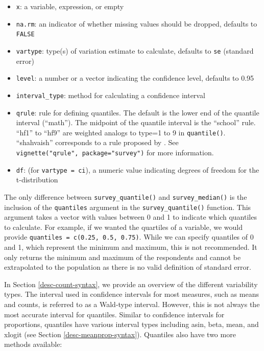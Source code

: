 \documentclass[
]{krantz}
\providecommand{\tightlist}{%
  \setlength{\itemsep}{0pt}\setlength{\parskip}{0pt}}
\begin{document}
\begin{itemize}
\tightlist
\item
  \texttt{x}: a variable, expression, or empty
\item
  \texttt{na.rm}: an indicator of whether missing values should be dropped, defaults to \texttt{FALSE}
\item
  \texttt{vartype}: type(s) of variation estimate to calculate, defaults to \texttt{se} (standard error)
\item
  \texttt{level}: a number or a vector indicating the confidence level, defaults to 0.95
\item
  \texttt{interval\_type}: method for calculating a confidence interval
\item
  \texttt{qrule}: rule for defining quantiles. The default is the lower end of the quantile interval (``math''). The midpoint of the quantile interval is the ``school'' rule. ``hf1'' to ``hf9'' are weighted analogs to type=1 to 9 in \texttt{quantile()}. ``shahvaish'' corresponds to a rule proposed by \citet{shahvaish}. See \texttt{vignette("qrule",\ package="survey")} for more information.
\item
  \texttt{df}: (for \texttt{vartype\ =\ \textquotesingle{}ci\textquotesingle{}}), a numeric value indicating degrees of freedom for the t-distribution
\end{itemize}

The only difference between \texttt{survey\_quantile()} and \texttt{survey\_median()} is the inclusion of the \texttt{quantiles} argument in the \texttt{survey\_quantile()} function. This argument takes a vector with values between 0 and 1 to indicate which quantiles to calculate. For example, if we wanted the quartiles of a variable, we would provide \texttt{quantiles\ =\ c(0.25,\ 0.5,\ 0.75)}. While we can specify quantiles of 0 and 1, which represent the minimum and maximum, this is not recommended. It only returns the minimum and maximum of the respondents and cannot be extrapolated to the population as there is no valid definition of standard error.

In Section \ref{desc-count-syntax}, we provide an overview of the different variability types. The interval used in confidence intervals for most measures, such as means and counts, is referred to as a Wald-type interval. However, this is not always the most accurate interval for quantiles. Similar to confidence intervals for proportions, quantiles have various interval types including asin, beta, mean, and xlogit (see Section \ref{desc-meanprop-syntax}). Quantiles also have two more methods available:
\end{document}
